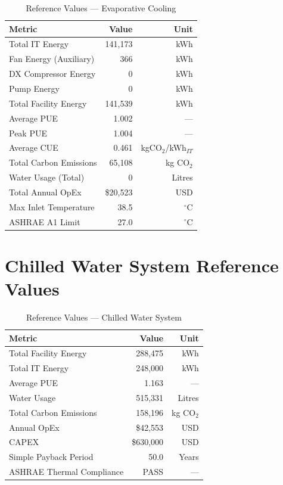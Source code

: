 \documentclass[12pt,a4paper]{report}
\newcommand{\degC}{$^{\circ}$C}
\begin{document}
\begin{table}[H]
\centering
\caption{Reference Values --- Evaporative Cooling}
\label{tab:ref_evap}
\renewcommand{\arraystretch}{1.3}
\begin{tabular}{lrr}
\toprule
\textbf{Metric} & \textbf{Value} & \textbf{Unit} \\
\midrule
Total IT Energy & 141{,}173 & kWh \\
Fan Energy (Auxiliary) & 366 & kWh \\
DX Compressor Energy & 0 & kWh \\
Pump Energy & 0 & kWh \\
Total Facility Energy & 141{,}539 & kWh \\
Average PUE & 1.002 & --- \\
Peak PUE & 1.004 & --- \\
Average CUE & 0.461 & kgCO$_2$/kWh$_{IT}$ \\
Total Carbon Emissions & 65{,}108 & kg CO$_2$ \\
Water Usage (Total) & 0 & Litres \\
Total Annual OpEx & \$20{,}523 & USD \\
Max Inlet Temperature & 38.5 & \degC \\
ASHRAE A1 Limit & 27.0 & \degC \\
\bottomrule
\end{tabular}
\end{table}

\section{Chilled Water System Reference Values}

\begin{table}[H]
\centering
\caption{Reference Values --- Chilled Water System}
\label{tab:ref_chilled}
\renewcommand{\arraystretch}{1.3}
\begin{tabular}{lrr}
\toprule
\textbf{Metric} & \textbf{Value} & \textbf{Unit} \\
\midrule
Total Facility Energy & 288{,}475 & kWh \\
Total IT Energy & 248{,}000 & kWh \\
Average PUE & 1.163 & --- \\
Water Usage & 515{,}331 & Litres \\
Total Carbon Emissions & 158{,}196 & kg CO$_2$ \\
Annual OpEx & \$42{,}553 & USD \\
CAPEX & \$630{,}000 & USD \\
Simple Payback Period & 50.0 & Years \\
ASHRAE Thermal Compliance & PASS & --- \\
\bottomrule
\end{tabular}
\end{table}
\end{document}
